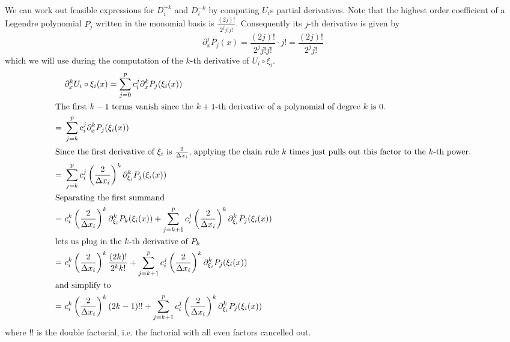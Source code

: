We can work out feasible expressions for $D_{i}^{+k}$ and $D_{i}^{-k}$ by computing $U_{i}$s partial derivatives.
Note that the highest order coefficient of a Legendre polynomial $P_{j}$ written in the monomial basis is $\frac{(2j)!}{2^{j} j! j!}$.
Consequently its $j$-th derivative is given by
\begin{equation*}
  \partial_{x}^{j} P_{j}(x) = \frac{(2j)!}{2^{j} j! j!} \cdot j! = \frac{(2j)!}{2^{j} j!}
\end{equation*}
which we will use during the computation of the $k$-th derivative of $U_{i} \circ \xi_{i}$.
\begin{align}
  & \partial_{x}^{k} U_{i} \circ \xi_{i}(x) = \sum_{j = 0}^{p} c_{i}^{j} \partial_{x}^{k} P_{j}(\xi_{i}(x))\nonumber\\
  \intertext{The first $k - 1$ terms vanish since the $k + 1$-th derivative of a polynomial of degree $k$ is $0$.}
  =~& \sum_{j = k}^{p} c_{i}^{j} \partial_{x}^{k} P_{j}(\xi_{i}(x))\nonumber\\
  \intertext{Since the first derivative of $\xi_{i}$ is $\frac{2}{\Delta x_{i}}$, applying the chain rule $k$ times just pulls out this factor to the $k$-th power.}
  =~& \sum_{j = k}^{p} c_{i}^{j} \left( \frac{2}{\Delta x_{i}} \right)^{k} \partial_{\xi_{i}}^{k} P_{j}(\xi_{i}(x))\nonumber\\
  \intertext{Separating the first summand}
  =~& c_{i}^{k} \left( \frac{2}{\Delta x_{i}} \right)^{k} \partial_{\xi_{i}}^{k} P_{k}(\xi_{i}(x)) + \sum_{j = k + 1}^{p} c_{i}^{j} \left( \frac{2}{\Delta x_{i}} \right)^{k} \partial_{\xi_{i}}^{k} P_{j}(\xi_{i}(x))\nonumber\\
  \intertext{lets us plug in the $k$-th derivative of $P_{k}$}
  =~& c_{i}^{k} \left( \frac{2}{\Delta x_{i}} \right)^{k} \frac{(2k)!}{2^{k} k!} + \sum_{j = k + 1}^{p} c_{i}^{j} \left( \frac{2}{\Delta x_{i}} \right)^{k} \partial_{\xi_{i}}^{k} P_{j}(\xi_{i}(x))\nonumber\\
  \intertext{and simplify to}
  =~& c_{i}^{k} \left( \frac{2}{\Delta x_{i}} \right)^{k} \left( 2k - 1 \right)!! + \sum_{j = k + 1}^{p} c_{i}^{j} \left( \frac{2}{\Delta x_{i}} \right)^{k} \partial_{\xi_{i}}^{k} P_{j}(\xi_{i}(x)) \label{eq:kth-deriv}
\end{align}
where $!!$ is the double factorial, i.e. the factorial with all even factors cancelled out.


